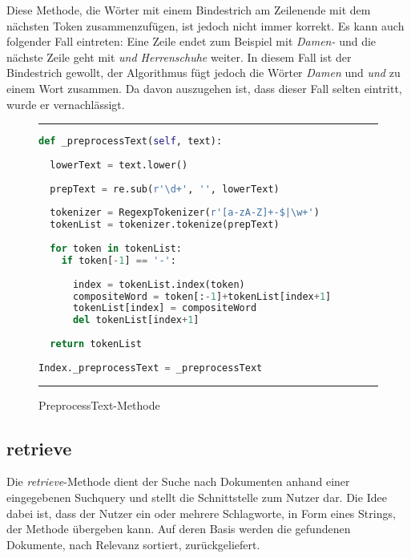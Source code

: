 Diese Methode, die Wörter mit einem Bindestrich am Zeilenende mit dem nächsten Token zusammenzufügen, ist jedoch nicht immer korrekt. Es kann auch folgender Fall eintreten: Eine Zeile endet zum Beispiel mit \textit{Damen-} und die nächste Zeile geht mit \textit{und Herrenschuhe} weiter. In diesem Fall ist der Bindestrich gewollt, der Algorithmus fügt jedoch die Wörter \textit{Damen} und \textit{und} zu einem Wort zusammen. Da davon auszugehen ist, dass dieser Fall selten eintritt, wurde er vernachlässigt.

\begin{figure}
	\rule{\textwidth}{0.4pt}
		\begin{lstlisting}[language=Python]
def _preprocessText(self, text):
    
  lowerText = text.lower()
    
  prepText = re.sub(r'\d+', '', lowerText)
            
  tokenizer = RegexpTokenizer(r'[a-zA-Z]+-$|\w+')
  tokenList = tokenizer.tokenize(prepText)
    
  for token in tokenList:
    if token[-1] == '-':
            
      index = tokenList.index(token)
      compositeWord = token[:-1]+tokenList[index+1]
      tokenList[index] = compositeWord
      del tokenList[index+1]
            
  return tokenList
    
Index._preprocessText = _preprocessText
		\end{lstlisting}
	\rule{\textwidth}{0.4pt}
	\caption{PreprocessText-Methode}
	\label{fig:preprocess}
\end{figure}

\subsection{retrieve}\label{retrieve}

Die \textit{retrieve}-Methode dient der Suche nach Dokumenten anhand einer eingegebenen Suchquery und stellt die Schnittstelle zum Nutzer dar. Die Idee dabei ist, dass der Nutzer ein oder mehrere Schlagworte, in Form eines Strings, der Methode übergeben kann. Auf deren Basis werden die gefundenen Dokumente, nach Relevanz sortiert, zurückgeliefert. 

